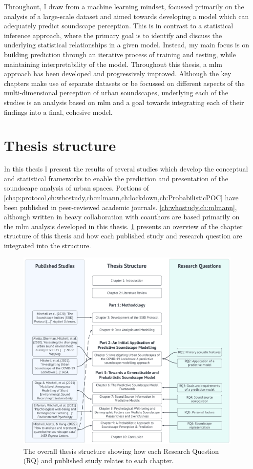 Throughout, I draw from a machine learning mindset, focussed primarily on the analysis of a large-scale dataset and aimed towards developing a model which can adequately predict soundscape perception. This is in contrast to a statistical inference approach, where the primary goal is to identify and discuss the underlying statistical relationships in a given model. Instead, my main focus is on building prediction through an iterative process of training and testing, while maintaining interpretability of the model. Throughout this thesis, a \gls{mlm} approach has been developed and progressively improved. Although the key chapters make use of separate datasets or be focussed on different aspects of the multi-dimensional perception of urban soundscapes, underlying each of the studies is an analysis based on \gls{mlm} and a goal towards integrating each of their findings into a final, cohesive model. 

\section{Thesis structure}

In this thesis I present the results of several studies which develop the conceptual and statistical frameworks to enable the prediction and presentation of the soundscape analysis of urban spaces. Portions of \cref{chap:protocol,ch:whostudy,ch:mlmann,ch:lockdown,ch:ProbabilisticPOC} have been published in peer-reviewed academic journals. \cref{ch:whostudy,ch:mlmann}, although written in heavy collaboration with coauthors are based primarily on the \gls{mlm} analysis developed in this thesis. \cref{fig:thesisStructure} presents an overview of the chapter structure of this thesis and how each published study and research question are integrated into the structure.

\begin{figure}[h]
  \centering
  \includegraphics[width=\textwidth]{Figures/Thesis Structure 2022-05-28.png}
  \caption{The overall thesis structure showing how each Research Question (RQ) and published study relates to each chapter. \label{fig:thesisStructure}}
\end{figure}

